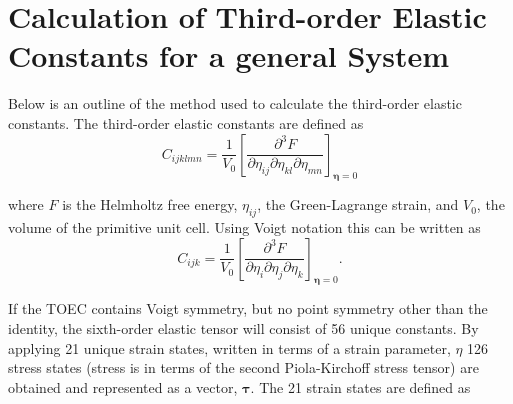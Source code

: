 \documentclass[showpacs,floatfix,aps,prb,preprint,superscriptaddress]{revtex4-1}
\begin{document}
\section*{Calculation of Third-order Elastic Constants for a general System}

Below is an outline of the method used to calculate the third-order elastic constants.  The third-order elastic constants are defined as 
\begin{equation}
C_{ijklmn} = \frac{1}{V_0} \left[ \frac{\partial^3F}{\partial \eta_{ij} \partial \eta_{kl} \partial \eta_{mn}} \right] _ {\bm{\eta} = 0}
\end{equation}

where $F$ is the Helmholtz free energy, $\eta_{ij}$, the Green-Lagrange strain, and $V_0$, the volume of the primitive unit cell.  Using Voigt notation this can be written as
\begin{equation}
C_{ijk} = \frac{1}{V_0} \left[ \frac{\partial^3F}{\partial \eta_{i} \partial \eta_{j} \partial \eta_{k}} \right] _ {\bm{\eta} = 0}.
\end{equation}

If the TOEC contains Voigt symmetry, but no point symmetry other than the identity, the sixth-order elastic tensor will consist of 56 unique constants.  By applying 21 unique strain states, written in terms of a strain parameter, $\eta$ 126 stress states (stress is in terms of the second Piola-Kirchoff stress tensor) are obtained and represented as a vector, $\bm{\tau}$.  The 21 strain states are defined as 
\end{document}
